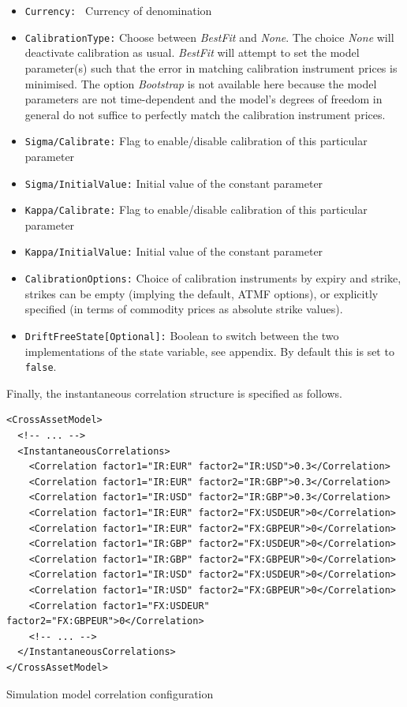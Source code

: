 \documentclass[12pt, a4paper]{article}
\begin{document}
{\begin{itemize}
\item {\tt Currency: } Currency of denomination
\item {\tt CalibrationType:} Choose between {\em BestFit} and {\em None}.  The choice {\em None} will deactivate calibration as usual. {\em BestFit} will attempt to set the model parameter(s) such that the error in matching calibration instrument prices is minimised.  The option  {\em Bootstrap} is not available here because the model parameters are not time-dependent and the model's degrees of freedom in general do not suffice to perfectly match the calibration instrument prices.
\item {\tt Sigma/Calibrate:} Flag to enable/disable calibration of this particular parameter
\item {\tt Sigma/InitialValue:} Initial value of the constant parameter
\item {\tt Kappa/Calibrate:} Flag to enable/disable calibration of this particular parameter
\item {\tt Kappa/InitialValue:} Initial value of the constant parameter
\item {\tt CalibrationOptions:} Choice of calibration instruments by expiry and strike, strikes can be empty 	(implying the default, ATMF options), or explicitly specified (in terms of commodity prices as absolute strike values). 
\item {\tt DriftFreeState[Optional]:} Boolean to switch between the two implementations of the state variable, see appendix. By default this is set to {\tt false}.        
\end{itemize}

\medskip
Finally, the instantaneous correlation structure is specified as follows.

\begin{listing}[H]
\begin{verbatim}
<CrossAssetModel>
  <!-- ... -->
  <InstantaneousCorrelations>
    <Correlation factor1="IR:EUR" factor2="IR:USD">0.3</Correlation>
    <Correlation factor1="IR:EUR" factor2="IR:GBP">0.3</Correlation>
    <Correlation factor1="IR:USD" factor2="IR:GBP">0.3</Correlation>
    <Correlation factor1="IR:EUR" factor2="FX:USDEUR">0</Correlation>
    <Correlation factor1="IR:EUR" factor2="FX:GBPEUR">0</Correlation>
    <Correlation factor1="IR:GBP" factor2="FX:USDEUR">0</Correlation>
    <Correlation factor1="IR:GBP" factor2="FX:GBPEUR">0</Correlation>
    <Correlation factor1="IR:USD" factor2="FX:USDEUR">0</Correlation>
    <Correlation factor1="IR:USD" factor2="FX:GBPEUR">0</Correlation>
    <Correlation factor1="FX:USDEUR" factor2="FX:GBPEUR">0</Correlation>
    <!-- ... --> 
  </InstantaneousCorrelations>
</CrossAssetModel>
\end{verbatim}
\caption{Simulation model correlation configuration}
\label{lst:simulation_model_correlation_configuration}
\end{listing}

}
\end{document}
